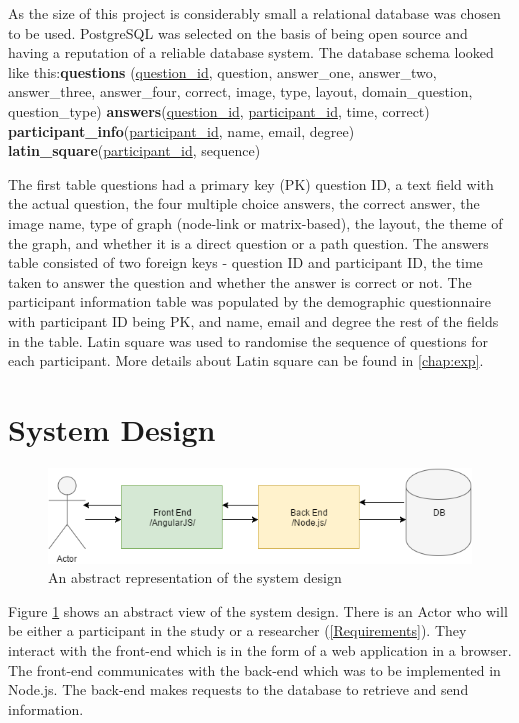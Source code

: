 \documentclass{l4proj}
\begin{document}
As the size of this project is considerably small a relational database was chosen to be used. PostgreSQL was selected on the basis of being open source and having a reputation of a reliable database system. The database schema looked like this:\newline \textbf{questions} (\underline{question\_id}, question, answer\_one, answer\_two, answer\_three,
		answer\_four, correct, image, type, layout, domain\_question, question\_type) \newline
\textbf{answers}(\underline{question\_id}, \underline{participant\_id}, time, correct) \newline
\textbf{participant\_info}(\underline{participant\_id}, name, email, degree) \newline
\textbf{latin\_square}(\underline{participant\_id}, sequence) \newline

The first table questions had a primary key (PK) question ID, a text field with the actual question, the four multiple choice answers, the correct answer, the image name, type of graph (node-link or matrix-based), the layout, the theme of the graph, and whether it is a direct question or a path question. The answers table consisted of two foreign keys - question ID and participant ID, the time taken to answer the question and whether the answer is correct or not. The participant information table was populated by the demographic questionnaire with participant ID being PK, and name, email and degree the rest of the fields in the table. Latin square was used to randomise the sequence of questions for each participant. More details about Latin square can be found in \autoref{chap:exp}.

\section{System Design}

\begin{figure}[H]
\centering
\includegraphics[width=11.5cm]{abstractDesign.png}
\caption{An abstract representation of the system design}
\label{abstractDesign}
\end{figure}


Figure \ref{abstractDesign} shows an abstract view of the system design. There is an Actor who will be either a participant in the study or a researcher (\autoref{Requirements}). They interact with the front-end which is in the form of a web application in a browser. The front-end communicates with the back-end which was to be implemented in Node.js. The back-end makes requests to the database to retrieve and send information. 
\end{document}
